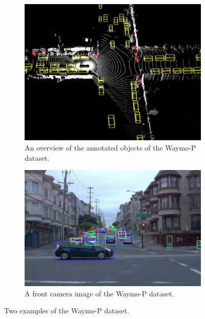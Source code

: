 \begin{figure}[h]
	\centering
	\begin{subfigure}[t]{0.4\linewidth}
		\includegraphics[width=\linewidth]{Figures/Datasets/WaymoP_Dataset}
		\caption{An overview of the annotated objects of the Waymo-P \cite{sun2020scalability} dataset.}
		\label{fig:dat_waymo_1}
	\end{subfigure} \hspace{0.1\textwidth}
	\begin{subfigure}[t]{0.4\linewidth}
		\includegraphics[width=\linewidth]{Figures/Datasets/WaymoP_Dataset2}
		\caption{A front camera image of the Waymo-P \cite{sun2020scalability} dataset.}
		\label{fig:dat_waymo_2}
	\end{subfigure}
	\caption{Two examples of the Waymo-P \cite{sun2020scalability} dataset.}
	\label{fig:dat_waymo_both}
\end{figure}

